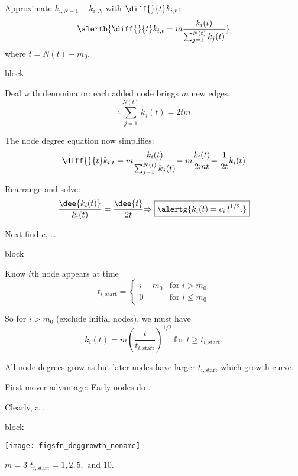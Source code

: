    Approximate 
   $k_{i,N+1} - k_{i,N}$ with $\diff{}{t} k_{i,t}$:
   {
     $$
     \alertb{
       \diff{}{t} k_{i,t}
       =
       m
       \frac{k_{i}(t)}
       {
         \sum_{j=1}^{N(t)} k_j(t)
       }
     }
   $$
   where $t = N(t) - m_0$.
   }
 
 


{block}{}
 
 
   Deal with denominator: each added node brings $m$ new edges.
   $$
   {
     \therefore 
     \sum_{j=1}^{N(t)} k_j(t)
     =
     2 t m
   }
   $$
 
   The node degree equation now simplifies:
   $$
   \diff{}{t} k_{i,t}
   =
   m
   \frac{k_{i}(t)}
   {
     \sum_{j=1}^{N(t)} k_j(t)
   }
   {
     =
     m
     \frac{k_{i}(t)}
     {
       2 m t
     }
   }
   {
     =
     \frac{1}
     {
       2 t
     }
     k_{i}(t)
   }
   $$
 
   Rearrange and solve:
   $$
   \frac{\dee{k_{i}(t)}}
   {k_{i}(t)}
   =
   \frac{\dee{t}}
   {2t}
   {
     \Rightarrow
     \boxed{\alertg{k_i(t) = c_i \,  t^{1/2}.}}
   }
   $$
 
   Next find $c_i$ \ldots
 
 

{block}{}
 
 
   Know $i$th node appears at time 
   $$
   t_{i,\textrm{start}} = \left\{
     \begin{array}{ll}
       i-m_0 & \mbox{for $i>m_0$} \\
       0 & \mbox{for $i \le m_0$}
     \end{array}
   \right.
   $$
 
   So for $i>m_0$ (exclude initial nodes),
   we must have
   $$
   k_i(t) 
   = 
   m 
   \left(
   \frac{t}{t_{i,\textrm{start}}}
   \right)^{1/2}
   \
   \mbox{for $t \ge t_{i,\textrm{start}}$}.
   $$
  
   All node degrees grow as 
   {but
   later nodes have larger $t_{i,\textrm{start}}$ which
    growth curve.}
  
   First-mover advantage: Early nodes do .
  
   Clearly, a .
 
 
 
{block}{}
    
   \texttt{[image: figsfn\_deggrowth\_noname]}
   
   
    $m = 3$
    $t_{i,\textrm{start}} = 1, 2, 5, \mbox{\ and\ } 10$.
   
